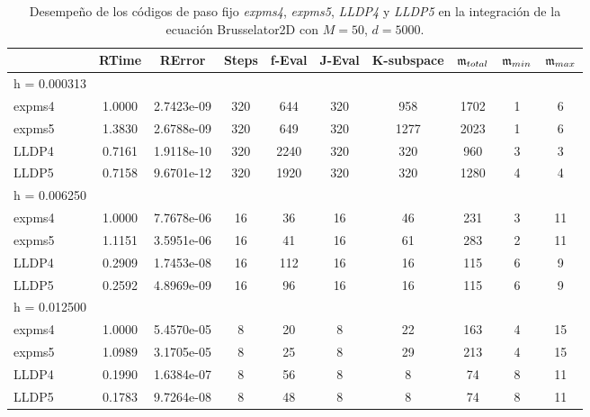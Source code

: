 \begin{table}[htb]
	\caption{Desempeño de los códigos de paso fijo \emph{expms4}, \emph{expms5}, \emph{LLDP4} y \emph{LLDP5} en la integración de la ecuación Brusselator2D con $M=50$, $d=5000$.}
	\centering
	\begin{adjustbox}{width=0.95\columnwidth,center}
	\begin{tabular}{lccccccccc}
		\hline
		& RTime & RError & Steps & f-Eval & J-Eval & K-subspace & $\mathfrak{m}_{total}$ & $\mathfrak{m}_{min}$ & $\mathfrak{m}_{max}$ \\
		\hline
		h = 0.000313 &  &  &  &  &  &  &  &  &  \\
		expms4 & 1.0000 & 2.7423e-09 & 320 & 644 & 320 & 958 & 1702 & 1 & 6  \\
		expms5 & 1.3830 & 2.6788e-09 & 320 & 649 & 320 & 1277 & 2023 & 1 & 6  \\
		LLDP4 & 0.7161 & 1.9118e-10 & 320 & 2240 & 320 & 320 & 960 & 3 & 3  \\
		LLDP5 & 0.7158 & 9.6701e-12 & 320 & 1920 & 320 & 320 & 1280 & 4 & 4  \\
		\hline
		h = 0.006250 &  &  &  &  &  &  &  &  &  \\
		expms4 & 1.0000 & 7.7678e-06 & 16 & 36 & 16 & 46 & 231 & 3 & 11  \\
		expms5 & 1.1151 & 3.5951e-06 & 16 & 41 & 16 & 61 & 283 & 2 & 11  \\
		LLDP4 & 0.2909 & 1.7453e-08 & 16 & 112 & 16 & 16 & 115 & 6 & 9  \\
		LLDP5 & 0.2592 & 4.8969e-09 & 16 & 96 & 16 & 16 & 115 & 6 & 9  \\
		\hline
		h = 0.012500 &  &  &  &  &  &  &  &  &  \\
		expms4 & 1.0000 & 5.4570e-05 & 8 & 20 & 8 & 22 & 163 & 4 & 15  \\
		expms5 & 1.0989 & 3.1705e-05 & 8 & 25 & 8 & 29 & 213 & 4 & 15  \\
		LLDP4 & 0.1990 & 1.6384e-07 & 8 & 56 & 8 & 8 & 74 & 8 & 11  \\
		LLDP5 & 0.1783 & 9.7264e-08 & 8 & 48 & 8 & 8 & 74 & 8 & 11  \\
		\hline
	\end{tabular}
\end{adjustbox}
	\label{tab:num-exp-lldp-fix-step:br2dna}
\end{table}

